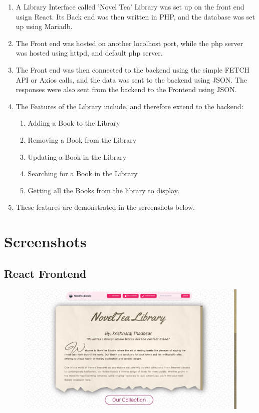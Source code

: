 \documentclass[11pt]{article}
\begin{document}
\begin{enumerate}
    \item A Library Interface called 'Novel Tea' Library was set up on the front end usign React. Its Back end was then written in PHP, and the database was set up using Mariadb.
    \item The Front end was hosted on another locolhost port, while the php server was hosted using httpd, and default php server.
    \item The Front end was then connected to the backend using the simple FETCH API or Axios calls, and the data was sent to the backend using JSON. The responses were also sent from the backend to the Frontend using JSON.
    \item The Features of the Library include, and therefore extend to the backend:
          \begin{enumerate}
              \item Adding a Book to the Library
              \item Removing a Book from the Library
              \item Updating a Book in the Library
              \item Searching for a Book in the Library
              \item Getting all the Books from the library to display.
          \end{enumerate}
    \item These features are demonstrated in the screenshots below.
\end{enumerate}

\section{Screenshots}

\subsection{React Frontend}
\begin{figure}[H]
    \centering
    \includegraphics[width=.95\textwidth]{screenshots/home.png}
    \caption{}
\end{figure}
\end{document}
